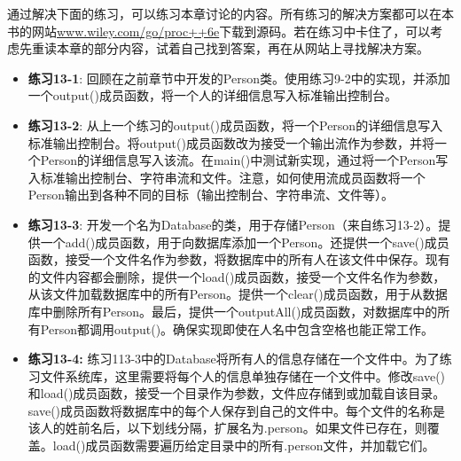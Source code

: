 通过解决下面的练习，可以练习本章讨论的内容。所有练习的解决方案都可以在本书的网站\url{www.wiley.com/go/proc++6e}下载到源码。若在练习中卡住了，可以考虑先重读本章的部分内容，试着自己找到答案，再在从网站上寻找解决方案。

\begin{itemize}
\item
\textbf{练习13-1}: 回顾在之前章节中开发的Person类。使用练习9-2中的实现，并添加一个output()成员函数，将一个人的详细信息写入标准输出控制台。

\item
\textbf{练习13-2}: 从上一个练习的output()成员函数，将一个Person的详细信息写入标准输出控制台。将output()成员函数改为接受一个输出流作为参数，并将一个Person的详细信息写入该流。在main()中测试新实现，通过将一个Person写入标准输出控制台、字符串流和文件。注意，如何使用流成员函数将一个Person输出到各种不同的目标（输出控制台、字符串流、文件等）。

\item
\textbf{练习13-3}: 开发一个名为Database的类，用于存储Person（来自练习13-2）。提供一个add()成员函数，用于向数据库添加一个Person。还提供一个save()成员函数，接受一个文件名作为参数，将数据库中的所有人在该文件中保存。现有的文件内容都会删除，提供一个load()成员函数，接受一个文件名作为参数，从该文件加载数据库中的所有Person。提供一个clear()成员函数，用于从数据库中删除所有Person。最后，提供一个outputAll()成员函数，对数据库中的所有Person都调用output()。确保实现即使在人名中包含空格也能正常工作。

\item
\textbf{练习13-4:} 练习113-3中的Database将所有人的信息存储在一个文件中。为了练习文件系统库，这里需要将每个人的信息单独存储在一个文件中。修改save()和load()成员函数，接受一个目录作为参数，文件应存储到或加载自该目录。save()成员函数将数据库中的每个人保存到自己的文件中。每个文件的名称是该人的姓前名后，以下划线分隔，扩展名为.person。如果文件已存在，则覆盖。load()成员函数需要遍历给定目录中的所有.person文件，并加载它们。
\end{itemize}

